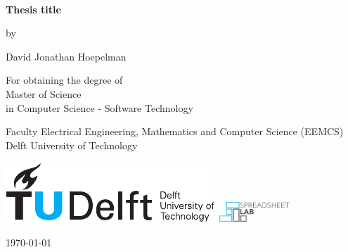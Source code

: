 \thispagestyle{empty}
\onecolumn
{%
\sffamily
\centering

~\vspace{\fill}

{\huge \bfseries
Thesis title
}

\vspace{2.0cm}

by

\vspace{2.0cm}

{\LARGE
David Jonathan Hoepelman
}

\vspace{3.0cm}


\vspace{2.5cm}

For obtaining the degree of \\
Master of Science \\
in Computer Science - Software Technology \\

\vspace{0.5cm}

Faculty Electrical Engineering, Mathematics and Computer Science (EEMCS)\\
Delft University of Technology

\vspace{1.5cm}

\includegraphics{tudelft}
\hspace{0.5cm}
\includegraphics[height=8mm]{spreadsheet-lab}
\hspace{0.5cm}

\vspace{\fill}

\today

}
